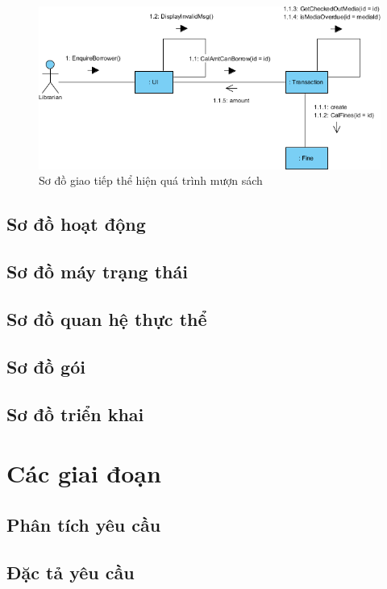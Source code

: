 \documentclass{article}
\begin{document}
  \begin{figure}[!ht]
    \centering
    \includegraphics[scale=0.7]{../pictures/diagrams/communication/communication-diagram-1.png}
    \caption{Sơ đồ giao tiếp thể hiện quá trình mượn sách}
  \end{figure}


  \subsection{Sơ đồ hoạt động}

  \subsection{Sơ đồ máy trạng thái}

  \subsection{Sơ đồ quan hệ thực thể}

  \subsection{Sơ đồ gói}

  \subsection{Sơ đồ triển khai}

\section{Các giai đoạn}
  \subsection{Phân tích yêu cầu}

  \subsection{Đặc tả yêu cầu}
\end{document}
